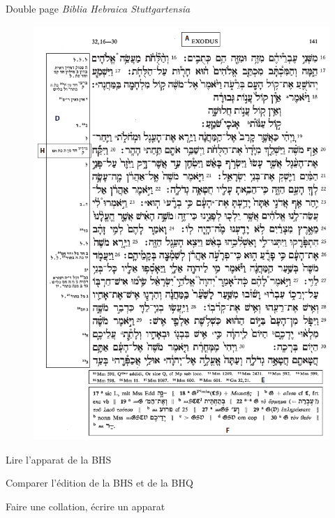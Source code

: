 \documentclass[11pt]{beamer}
\begin{document}
\begin{frame}{Double page \textit{Biblia Hebraica Stuttgartensia}}
\begin{minipage}{.45\textwidth}
\begin{figure}
        \includegraphics[width=1\linewidth]{img/BHSrecto.png}
    \end{figure}
\end{minipage}
\end{frame}


\begin{frame}{Lire l'apparat de la BHS}
    
\end{frame}

\begin{frame}{Comparer l'édition de la BHS et de la BHQ}
    
\end{frame}

\begin{frame}{Faire une collation, écrire un apparat} 
\end{frame}
\end{document}
